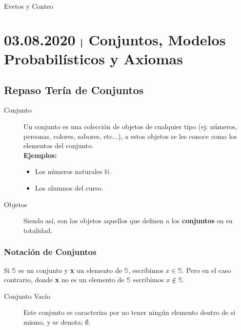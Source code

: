 \documentclass[a4paper]{book}
\begin{document}
    \titPag
    \tableofcontents



    \begin{chapter}{Evetos y Conteo}
    \label{chap:evetos_y_conteo}

    \section{03.08.2020 $\mybar$ Conjuntos, Modelos Probabilísticos y Axiomas}
    \label{sec:conjuntos_modelos_probabilisticos_y_axiomas}

    \subsection{Repaso Tería de Conjuntos}
    \label{ssec:repaso_teria_de_conjuntos}

    \begin{description}
        \item[Conjunto] Un conjunto es una colección de objetos de cualquier
            tipo (ej: números, personas, colores, sabores, etc...), a estos
            objetos se les  conoce como los elementos del conjunto.\\
            \textbf{Ejemplos:}
            \begin{itemize}
                \item Los números naturales $\mathbb N$.
                \item Los alumnos del curso.
            \end{itemize}
        \item[Objetos] Siendo así, son los objetos aquellos que definen a los
            \textbf{conjuntos} en su totalidad.
    \end{description}
    \subsubsection{Notación de Conjuntos}
    \label{ssec:notacion_de_conjuntos}

        Si $\mathbb S$ es un conjunto y \textbf{x} un elemento de $\mathbb S$,
        escribimos $x\in \mathbb S$. Pero en el caso contrario, donde
        \textbf{x} no es un elemento de $\mathbb S$ escribimos $x\notin \mathbb
        S$.

    \begin{description}
        \item[Conjunto Vacío] Este conjunto se caracteriza por no tener ningún
            elemento dentro de si mismo, y se denota: $\emptyset$.
    \end{description}


\end{chapter}
\end{document}
